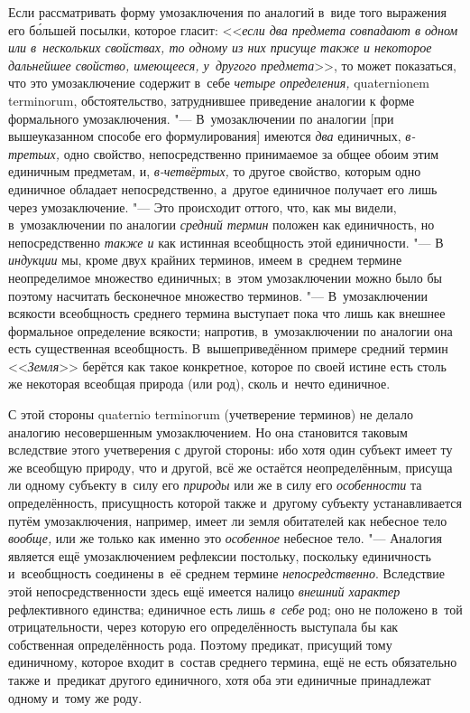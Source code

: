Если рассматривать форму умозаключения по аналогий в~виде того
выражения его б\'{о}льшей посылки, которое гласит:
<<{\em если два предмета совпадают в
одном или в~нескольких свойствах, то одному из них присуще также и
некоторое дальнейшее свойство, имеющееся, у~другого предмета}>>,
то может показаться, что это умозаключение содержит в~себе
{\em четыре определения,} quaterni\-onem
termi\-norum, обстоятельство, затруднившее приведение аналогии
к форме формального умозаключения. "--- В~умозаключении по
аналогии [при вышеуказанном способе его формулирования] имеются
{\em два} единичных,
{\em в-третьих,} одно
свойство, непосредственно принимаемое за общее обоим этим единичным
предметам, и, {\em в-четвёртых,}
то другое свойство, которым одно единичное обладает
непосредственно, а~другое единичное получает его лишь через умозаключение.
"--- Это происходит оттого, что, как мы видели, в~умозаключении
по аналогии {\em средний термин}
положен как единичность, но непосредственно
{\em также и} как
истинная всеобщность этой единичности. "--- В
{\em индукции} мы, кроме
двух крайних терминов, имеем в~среднем термине неопределимое множество
единичных; в~этом умозаключении можно было бы поэтому насчитать бесконечное
множество терминов. "--- В~умозаключении всякости всеобщность
среднего термина выступает пока что лишь как внешнее формальное определение
всякости; напротив, в~умозаключении по аналогии она есть существенная
всеобщность. В~вышеприведённом примере средний термин
<<{\em Земля}>> берётся как
такое конкретное, которое по своей истине есть столь же некоторая всеобщая
природа (или род), сколь и~нечто единичное.

С этой стороны quaternio terminorum
(учетверение терминов) не делало аналогию несовершенным
умозаключением. Но она становится таковым вследствие этого учетверения с
другой стороны: ибо хотя один субъект имеет ту же всеобщую природу, что и
другой, всё же остаётся неопределённым, присуща ли одному субъекту в~силу
его {\em природы} или же
в силу его {\em особенности}
та определённость, присущность которой также и~другому
субъекту устанавливается путём умозаключения, например, имеет ли земля
обитателей как небесное тело
{\em вообще,} или же
только как именно это {\em особенное}
небесное тело. "--- Аналогия является ещё
умозаключением рефлексии постольку, поскольку единичность и~всеобщность
соединены в~её среднем термине
{\em непосредственно}.
Вследствие этой непосредственности здесь ещё имеется налицо
{\em внешний характер}
рефлективного единства; единичное есть лишь
{\em в~себе} род; оно не
положено в~той отрицательности, через которую его определённость выступала
бы как собственная определённость рода. Поэтому предикат, присущий тому
единичному, которое входит в~состав среднего термина, ещё не есть
обязательно также и~предикат другого единичного, хотя оба эти единичные
принадлежат одному и~тому же роду.

